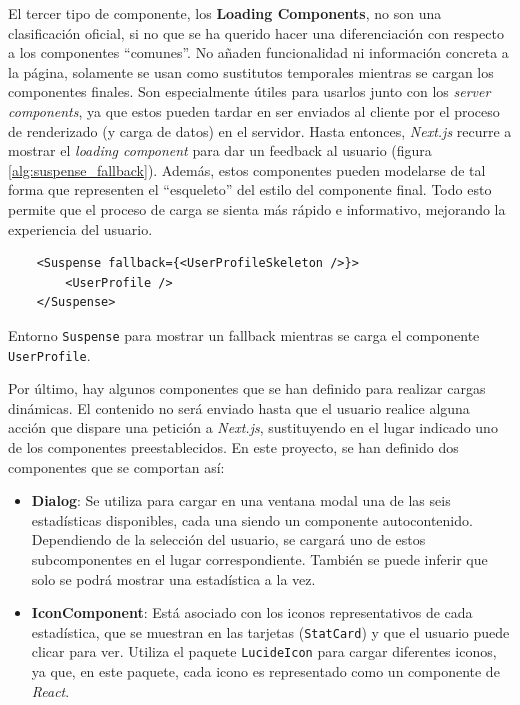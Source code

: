 El tercer tipo de componente, los \textbf{Loading Components}, no son una clasificación oficial, si no que se ha querido hacer una diferenciación con respecto a los componentes ``comunes''. No añaden funcionalidad ni información concreta a la página, solamente se usan como sustitutos temporales mientras se cargan los componentes finales. Son especialmente útiles para usarlos junto con los \textit{server components}, ya que estos pueden tardar en ser enviados al cliente por el proceso de renderizado (y carga de datos) en el servidor. Hasta entonces, \textit{Next.js} recurre a mostrar el \textit{loading component} para dar un feedback al usuario (figura \ref{alg:suspense_fallback}). Además, estos componentes pueden modelarse de tal forma que representen el ``esqueleto'' del estilo del componente final. Todo esto permite que el proceso de carga se sienta más rápido e informativo, mejorando la experiencia del usuario.

\setlength{\intextsep}{15pt} %
\setlength{\abovecaptionskip}{0pt} %
\setlength{\belowcaptionskip}{0pt} %

\begin{ifalgorithm}[H]
    \begin{lstlisting}
    <Suspense fallback={<UserProfileSkeleton />}>
        <UserProfile />
    </Suspense>
    \end{lstlisting}
    \caption{Entorno \texttt{Suspense} para mostrar un fallback mientras se carga el componente \texttt{UserProfile}.}
    \label{alg:suspense_fallback}
\end{ifalgorithm}

Por último, hay algunos componentes que se han definido para realizar cargas dinámicas. El contenido no será enviado hasta que el usuario realice alguna acción que dispare una petición a \textit{Next.js}, sustituyendo en el lugar indicado uno de los componentes preestablecidos. En este proyecto, se han definido dos componentes que se comportan así:

\begin{itemize}
    \item \textbf{Dialog}: Se utiliza para cargar en una ventana modal una de las seis estadísticas disponibles, cada una siendo un componente autocontenido. Dependiendo de la selección del usuario, se cargará uno de estos subcomponentes en el lugar correspondiente. También se puede inferir que solo se podrá mostrar una estadística a la vez.
    \item \textbf{IconComponent}: Está asociado con los iconos representativos de cada estadística, que se muestran en las tarjetas (\texttt{StatCard}) y que el usuario puede clicar para ver. Utiliza el paquete \texttt{LucideIcon} para cargar diferentes iconos, ya que, en este paquete, cada icono es representado como un componente de \textit{React}.
\end{itemize}

